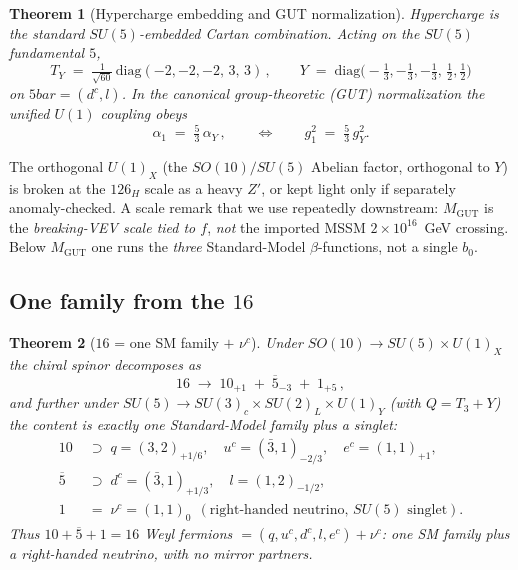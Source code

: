 \documentclass[11pt]{article}
\theoremstyle{plain}
\newtheorem{theorem}{Theorem}[section]
\theoremstyle{definition}
\theoremstyle{remark}
\begin{document}
\begin{theorem}[Hypercharge embedding and GUT normalization]\label{thm:sm:hypercharge}
Hypercharge is the standard $SU(5)$-embedded Cartan combination. Acting on the
$SU(5)$ fundamental $5$,
\begin{equation}\label{eq:sm:TY}
T_Y \;=\; \tfrac{1}{\sqrt{60}}\,\mathrm{diag}(-2,-2,-2,\,3,\,3)\,,
\qquad
Y \;=\; \mathrm{diag}\!\big(-\tfrac13,-\tfrac13,-\tfrac13,\,\tfrac12,\tfrac12\big)
\end{equation}
on $5bar=(d^c,l)$. In the canonical group-theoretic (GUT) normalization the unified
$U(1)$ coupling obeys
\begin{equation}\label{eq:sm:alpha1}
\alpha_1 \;=\; \tfrac{5}{3}\,\alpha_Y\,,
\qquad\Longleftrightarrow\qquad
g_1^2 \;=\; \tfrac{5}{3}\,g_Y^2 .
\end{equation}
\end{theorem}

The orthogonal $U(1)_X$ (the $SO(10)/SU(5)$ Abelian factor, orthogonal to $Y$) is
broken at the $126_H$ scale as a heavy $Z'$, or kept light only if separately
anomaly-checked. A scale remark that we use repeatedly downstream: $M_{\mathrm{GUT}}$
is the \emph{breaking-VEV scale tied to $f$}, \emph{not} the imported MSSM
$2\times10^{16}$~GeV crossing. Below $M_{\mathrm{GUT}}$ one runs the \emph{three}
Standard-Model $\beta$-functions, not a single $b_0$.

\subsection{One family from the \texorpdfstring{$16$}{16}}
\label{sec:sm:family}

\begin{theorem}[$16$ = one SM family $+$ $\nu^c$]\label{thm:sm:family}
Under $SO(10)\to SU(5)\times U(1)_X$ the chiral spinor decomposes as
\begin{equation}\label{eq:sm:16branch}
16 \;\longrightarrow\; 10_{+1}\;+\;\overline{5}_{-3}\;+\;1_{+5}\,,
\end{equation}
and further under $SU(5)\to SU(3)_c\times SU(2)_L\times U(1)_Y$ (with $Q=T_3+Y$) the
content is exactly one Standard-Model family plus a singlet:
\begin{equation}\label{eq:sm:family}
\begin{aligned}
10 &\;\supset\; q=(3,2)_{+1/6},\quad u^c=(\bar3,1)_{-2/3},\quad e^c=(1,1)_{+1},\\
\overline{5} &\;\supset\; d^c=(\bar3,1)_{+1/3},\quad l=(1,2)_{-1/2},\\
1 &\;=\; \nu^c=(1,1)_{0}\ \ (\text{right-handed neutrino, $SU(5)$ singlet}).
\end{aligned}
\end{equation}
Thus $10+\overline{5}+1=16$ Weyl fermions $=(q,u^c,d^c,l,e^c)+\nu^c$: one SM family
plus a right-handed neutrino, with no mirror partners.
\end{theorem}
\end{document}
